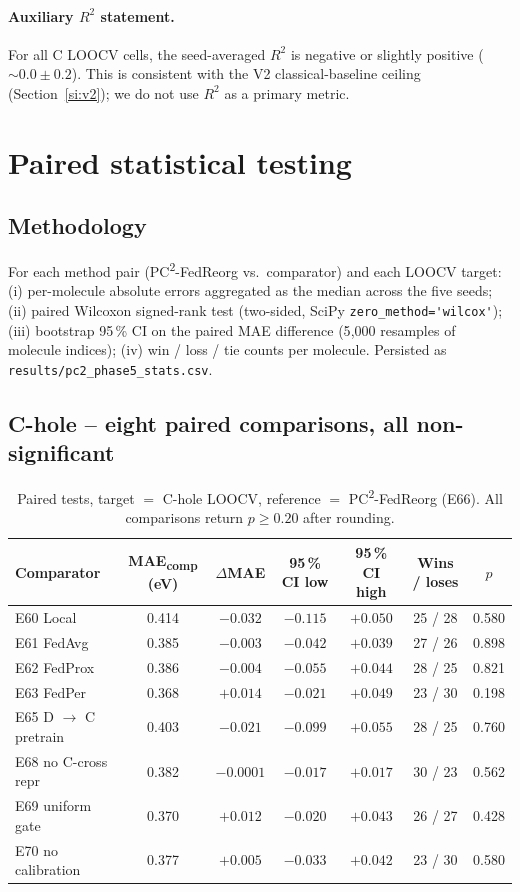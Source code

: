 \documentclass[11pt,a4paper]{article}
\newcommand{\PC}{PC\textsuperscript{2}-FedReorg}
\begin{document}
\paragraph{Auxiliary $R^2$ statement.} For all C LOOCV cells, the seed-averaged $R^2$ is negative or slightly positive ($\sim 0.0 \pm 0.2$). This is consistent with the V2 classical-baseline ceiling (Section~\ref{si:v2}); we do not use $R^2$ as a primary metric.

\section{Paired statistical testing}\label{si:paired}

\subsection{Methodology}
For each method pair (\PC{} vs.\ comparator) and each LOOCV target: (i) per-molecule absolute errors aggregated as the median across the five seeds; (ii) paired Wilcoxon signed-rank test (two-sided, SciPy \verb|zero_method='wilcox'|); (iii) bootstrap 95\,\% CI on the paired MAE difference (5{,}000 resamples of molecule indices); (iv) win / loss / tie counts per molecule. Persisted as \texttt{results/pc2\_phase5\_stats.csv}.

\subsection{C-hole -- eight paired comparisons, all non-significant}
\begin{table}[h]
\centering
\small
\caption{Paired tests, target $=$ C-hole LOOCV, reference $=$ \PC{} (E66). All comparisons return $p \ge 0.20$ after rounding.}\label{tab:si:paired-hole}
\begin{tabular}{@{}lcccccc@{}}
\toprule
Comparator & MAE\textsubscript{comp} (eV) & $\Delta$MAE & 95\,\% CI low & 95\,\% CI high & Wins / loses & $p$ \\
\midrule
E60 Local           & 0.414 & $-0.032$ & $-0.115$ & $+0.050$ & 25 / 28 & 0.580 \\
E61 FedAvg          & 0.385 & $-0.003$ & $-0.042$ & $+0.039$ & 27 / 26 & 0.898 \\
E62 FedProx         & 0.386 & $-0.004$ & $-0.055$ & $+0.044$ & 28 / 25 & 0.821 \\
E63 FedPer          & 0.368 & $+0.014$ & $-0.021$ & $+0.049$ & 23 / 30 & 0.198 \\
E65 D $\to$ C pretrain      & 0.403 & $-0.021$ & $-0.099$ & $+0.055$ & 28 / 25 & 0.760 \\
E68 no C-cross repr & 0.382 & $-0.0001$ & $-0.017$ & $+0.017$ & 30 / 23 & 0.562 \\
E69 uniform gate    & 0.370 & $+0.012$ & $-0.020$ & $+0.043$ & 26 / 27 & 0.428 \\
E70 no calibration  & 0.377 & $+0.005$ & $-0.033$ & $+0.042$ & 23 / 30 & 0.580 \\
\bottomrule
\end{tabular}
\end{table}
\end{document}
